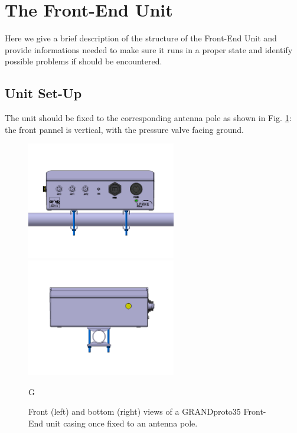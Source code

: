 \section{The Front-End Unit} 
\label{feu}
Here we give a brief description of the structure of the Front-End Unit and provide informations needed to make sure it runs in a proper state and identify possible problems if should be encountered. 

\subsection{Unit Set-Up}
The unit should be fixed to the corresponding antenna pole as shown in Fig. \ref{fig:casing}: the front pannel is vertical, with the pressure valve facing ground. 

\begin{figure}[t!]
\begin{center}
{
\includegraphics[width=6.5cm,angle=90]{plots/casing.jpg}  
\includegraphics[width=6.5cm,angle=90]{plots/casing_bottom.jpg} 
}
\end{center}
\caption{Front (left) and bottom (right) views of a GRANDproto35 Front-End unit casing once fixed to an antenna pole. 
}
\label{fig:casing} 
G\end{figure}


